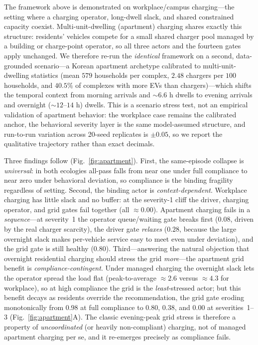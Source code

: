 \documentclass[12pt]{article}
\newcommand{\figref}[1]{Fig.~\ref{#1}}
\begin{document}
The framework above is demonstrated on workplace/campus charging---the setting where a charging operator, long-dwell slack, and shared constrained capacity coexist. Multi-unit-dwelling (apartment) charging shares exactly this structure: residents' vehicles compete for a small shared charger pool managed by a building or charge-point operator, so all three actors and the fourteen gates apply unchanged. We therefore re-run the \emph{identical} framework on a second, data-grounded scenario---a Korean apartment archetype calibrated to multi-unit-dwelling statistics (mean $579$ households per complex, $2.48$ chargers per $100$ households, and $40.5\%$ of complexes with more EVs than chargers)---which shifts the temporal context from morning arrivals and ${\sim}6.6$ h dwells to evening arrivals and overnight (${\sim}12$--$14$ h) dwells. This is a scenario stress test, not an empirical validation of apartment behavior: the workplace case remains the calibrated anchor, the behavioral severity layer is the same model-assumed structure, and run-to-run variation across 20-seed replicates is ${\pm}0.05$, so we report the qualitative trajectory rather than exact decimals.

Three findings follow (\figref{fig:apartment}). First, the same-episode collapse is \emph{universal}: in both ecologies all-pass falls from near one under full compliance to near zero under behavioral deviation, so compliance is the binding fragility regardless of setting. Second, the binding actor is \emph{context-dependent}. Workplace charging has little slack and no buffer: at the severity-1 cliff the driver, charging operator, and grid gates fail together (all ${\approx}0.00$). Apartment charging fails in a \emph{sequence}---at severity~1 the operator queue/waiting gate breaks first ($0.08$, driven by the real charger scarcity), the driver gate \emph{relaxes} ($0.28$, because the large overnight slack makes per-vehicle service easy to meet even under deviation), and the grid gate is still healthy ($0.80$). Third---answering the natural objection that overnight residential charging should stress the grid \emph{more}---the apartment grid benefit is \emph{compliance-contingent}. Under managed charging the overnight slack lets the operator spread the load flat (peak-to-average ${\approx}2.6$ versus ${\approx}4.3$ for workplace), so at high compliance the grid is the \emph{least}-stressed actor; but this benefit decays as residents override the recommendation, the grid gate eroding monotonically from $0.98$ at full compliance to $0.80$, $0.38$, and $0.00$ at severities~1--3 (\figref{fig:apartment}A). The classic evening-peak grid stress is therefore a property of \emph{uncoordinated} (or heavily non-compliant) charging, not of managed apartment charging per se, and it re-emerges precisely as compliance fails.
\end{document}
